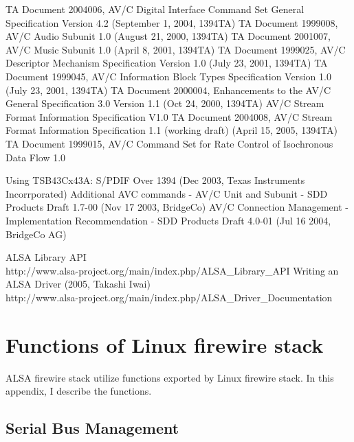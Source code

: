 \documentclass[onecolumn]{article}
\begin{document}
\begin{thebibliography}{99}
TA Document 2004006, AV/C Digital Interface Command Set General Specification Version 4.2 (September 1, 2004, 1394TA)
TA Document 1999008, AV/C Audio Subunit 1.0 (August 21, 2000, 1394TA)
TA Document 2001007, AV/C Music Subunit 1.0 (April 8, 2001, 1394TA)
TA Document 1999025, AV/C Descriptor Mechanism Specification Version 1.0 (July 23, 2001, 1394TA)
TA Document 1999045, AV/C Information Block Types Specification Version 1.0 (July 23, 2001, 1394TA)
TA Document 2000004, Enhancements to the AV/C General Specification 3.0 Version 1.1 (Oct 24, 2000, 1394TA)
AV/C Stream Format Information Specification V1.0
TA Document 2004008, AV/C Stream Format Information Specification 1.1 (working draft) (April 15, 2005, 1394TA)
TA Document 1999015, AV/C Command Set for Rate Control of Isochronous Data Flow 1.0

Using TSB43Cx43A: S/PDIF Over 1394 (Dec 2003, Texas Instruments Incorrporated)
Additional AVC commands - AV/C Unit and Subunit - SDD Products Draft 1.7-00 (Nov 17 2003, BridgeCo)
AV/C Connection Management - Implementation Recommendation - SDD Products Draft 4.0-01 (Jul 16 2004, BridgeCo AG)

ALSA Library API \\
http://www.alsa-project.org/main/index.php/ALSA\_Library\_API
Writing an ALSA Driver (2005, Takashi Iwai) \\
http://www.alsa-project.org/main/index.php/ALSA\_Driver\_Documentation

\end{thebibliography}

\newpage

\appendix


\section{Functions of Linux firewire stack}

ALSA firewire stack utilize functions exported by Linux firewire stack. In this appendix, I describe the functions.

\subsection{Serial Bus Management}
\end{document}
